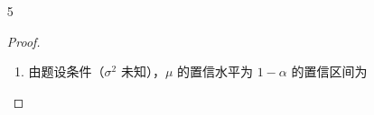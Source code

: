 \documentclass[normal,founder,mtpro2,cn]{elegantnote}
\begin{document}
\begin{enumerate}
\begin{proof}
\begin{enumerate}
\begin{equation*}
                      \end{equation*}
                \item 因 $Y=\ln X$ 服从正态分布 $N\left(\mu,1\right)$，有 $X=\mathrm{e}^{Y}$。 且 $Y$ 的密度函数为
                      \begin{equation*}
                          p(y)=\frac{1}{\sqrt{2\pi}}\mathrm{e}^{-\frac{(y-\mu)^{2}}{2}}
                      \end{equation*}
                      则
                      \begin{equation*}
                          \begin{aligned}
                              E(X)= & \int_{-\infty}^{+\infty}\mathrm{e}^{y}\cdot\frac{1}{\sqrt{2\pi}}\mathrm{e}^{-\frac{(y-\mu)^{2}}{2}}\,\mathrm{d}y                                           \\
                              =     & \int_{-\infty}^{+\infty}\frac{1}{\sqrt{2\pi}}\mathrm{e}^{-\frac{y^{2}-2\mu y+\mu^{2}-2 }{2}}\,\mathrm{d}y                                                  \\
                              =     & \int_{-\infty}^{+\infty}\frac{1}{\sqrt{2\pi}}\mathrm{e}^{-\frac{y^{2}-2(\mu+1)y+(\mu+1)^{2}-2\mu-1}{2}}\,\mathrm{d}y                                       \\
                              =     & \mathrm{e}^{\mu+\frac{1}{2}}\int_{-\infty}^{+\infty}\frac{1}{\sqrt{2 \pi}} \mathrm{e}^{-\frac{(y-\mu-1)^{2}}{2}}\,\mathrm{d}y=\mathrm{e}^{\mu+\frac{1}{2}}
                          \end{aligned}
                      \end{equation*}
                      由于 $E(X)=\mathrm{e}^{\mu+\frac{1}{2}}$ 为 $\mu$ 的严格单调增函数，因此，$E(X)$ 的置信水平为 95\% 的置信区间为
                      \begin{equation*}
                          \left[\mathrm{e}^{-0.98+0.5},\mathrm{e}^{0.98+0.5}\right]=[0.6188,4.3929]
                      \end{equation*}
            \end{enumerate}
        \end{proof}
    \item[5]
        \begin{proof}
            \begin{enumerate}
                \item 由题设条件（$\sigma^{2}$ 未知），$\mu$ 的置信水平为 $1-\alpha$ 的置信区间为
                      \begin{equation*}

\end{equation*}
\end{enumerate}
\end{proof}
\end{enumerate}
\end{document}
